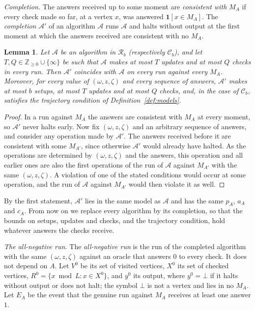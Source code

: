 \documentclass{amsart}
\theoremstyle{plain}
\newtheorem{lemma}[theorem]{Lemma}
\theoremstyle{definition}
\theoremstyle{remark}
\newcommand{\Z}{\mathbb{Z}}
\newcommand{\res}{\mathcal{R}}
\newcommand{\con}{\mathcal{C}}
\newcommand{\alg}{\mathcal{A}}
\begin{document}
\emph{Completion.}
The answers received up to some moment are \emph{consistent with} $M_A$ if every check made so far, at a vertex $x$, was answered $\mathbf 1[x\in M_A]$. The \emph{completion} $\alg'$ of an algorithm $\alg$ runs $\alg$ and halts without output at the first moment at which the answers received are consistent with no $M_A$.

\begin{lemma}\label{lem:completion}
Let $\alg$ be an algorithm in $\res_b$ (respectively $\con_b$), and let $T,Q\in\Z_{\ge0}\cup\{\infty\}$ be such that $\alg$ makes at most $T$ updates and at most $Q$ checks in every run. Then $\alg'$ coincides with $\alg$ on every run against every $M_A$. Moreover, for every value of $(\omega,z,\zeta)$ and every sequence of answers, $\alg'$ makes at most $b$ setups, at most $T$ updates and at most $Q$ checks, and, in the case of $\con_b$, satisfies the trajectory condition of Definition~\ref{def:models}.
\end{lemma}

\begin{proof}
In a run against $M_A$ the answers are consistent with $M_A$ at every moment, so $\alg'$ never halts early. Now fix $(\omega,z,\zeta)$ and an arbitrary sequence of answers, and consider any operation made by $\alg'$. The answers received before it are consistent with some $M_{A'}$, since otherwise $\alg'$ would already have halted. As the operations are determined by $(\omega,z,\zeta)$ and the answers, this operation and all earlier ones are also the first operations of the run of $\alg$ against $M_{A'}$ with the same $(\omega,z,\zeta)$. A violation of one of the stated conditions would occur at some operation, and the run of $\alg$ against $M_{A'}$ would then violate it as well.
\end{proof}

By the first statement, $\alg'$ lies in the same model as $\alg$ and has the same $p_A$, $a_A$ and $c_A$. From now on we replace every algorithm by its completion, so that the bounds on setups, updates and checks, and the trajectory condition, hold whatever answers the checks receive.

\emph{The all-negative run.}
The \emph{all-negative run} is the run of the completed algorithm with the same $(\omega,z,\zeta)$ against an oracle that answers $0$ to every check. It does not depend on $A$. Let $V^0$ be its set of visited vertices, $X^0$ its set of checked vertices, $R^0=\{x\bmod L: x\in X^0\}$, and $y^0$ its output, where $y^0=\bot$ if it halts without output or does not halt; the symbol $\bot$ is not a vertex and lies in no $M_A$. Let $E_A$ be the event that the genuine run against $M_A$ receives at least one answer $1$.
\end{document}
